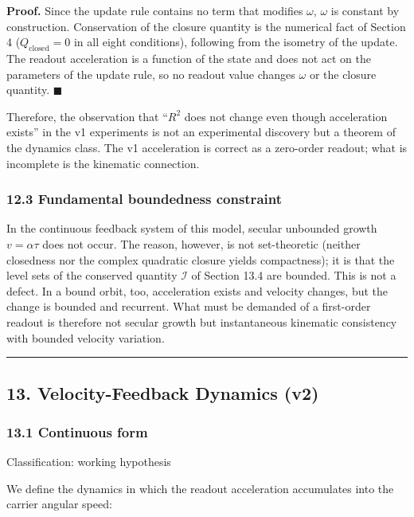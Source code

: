 \documentclass[
  a4paper,
]{article}
\begin{document}
\textbf{Proof.} Since the update rule contains no term that modifies
\(\omega\), \(\omega\) is constant by construction. Conservation of the
closure quantity is the numerical fact of Section 4
(\(Q_{\mathrm{closed}}=0\) in all eight conditions), following from the
isometry of the update. The readout acceleration is a function of the
state and does not act on the parameters of the update rule, so no
readout value changes \(\omega\) or the closure quantity.
\(\blacksquare\)

Therefore, the observation that ``\(R^2\) does not change even though
acceleration exists'' in the v1 experiments is not an experimental
discovery but a theorem of the dynamics class. The v1 acceleration is
correct as a zero-order readout; what is incomplete is the kinematic
connection.

\subsubsection{12.3 Fundamental boundedness
constraint}\label{fundamental-boundedness-constraint}

In the continuous feedback system of this model, secular unbounded
growth \(v=\alpha\tau\) does not occur. The reason, however, is not
set-theoretic (neither closedness nor the complex quadratic closure
yields compactness); it is that the level sets of the conserved quantity
\(\mathcal I\) of Section 13.4 are bounded. This is not a defect. In a
bound orbit, too, acceleration exists and velocity changes, but the
change is bounded and recurrent. What must be demanded of a first-order
readout is therefore not secular growth but instantaneous kinematic
consistency with bounded velocity variation.

\begin{center}\rule{0.5\linewidth}{0.5pt}\end{center}

\subsection{13. Velocity-Feedback Dynamics
(v2)}\label{velocity-feedback-dynamics-v2}

\subsubsection{13.1 Continuous form}\label{continuous-form}

Classification: working hypothesis

We define the dynamics in which the readout acceleration accumulates
into the carrier angular speed:
\end{document}
